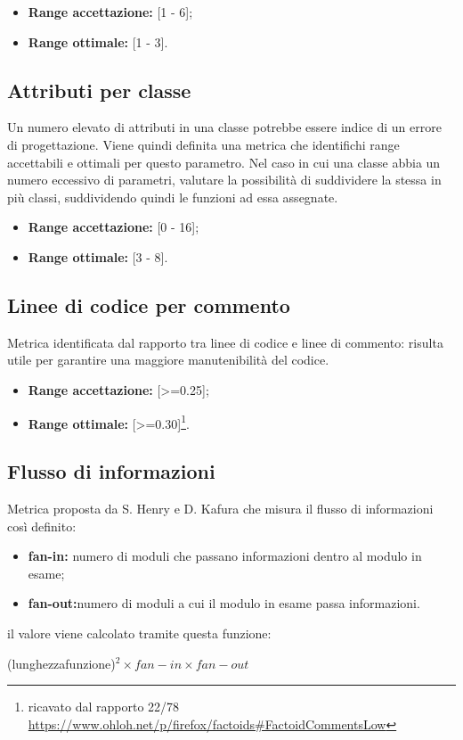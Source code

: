 \begin{itemize}
	\item \textbf{Range accettazione:} [1 - 6];
	\item \textbf{Range ottimale:} [1 - 3].
\end{itemize}  


\subsection{Attributi per classe}
Un numero elevato di attributi in una classe potrebbe essere indice di un errore di progettazione.
Viene quindi definita una metrica che identifichi range accettabili e ottimali per questo parametro.
Nel caso in cui una classe abbia un numero eccessivo di parametri, valutare la possibilità di suddividere la stessa in più classi, suddividendo quindi le funzioni ad essa assegnate.

\begin{itemize}
	\item \textbf{Range accettazione:} [0 - 16];
	\item \textbf{Range ottimale:} [3 - 8].
\end{itemize}  

\subsection{Linee di codice per commento}
Metrica identificata dal rapporto tra linee di codice e linee di commento: risulta utile per garantire una maggiore manutenibilità del codice.

\begin{itemize}
	\item \textbf{Range accettazione:} [>=0.25];
	\item \textbf{Range ottimale:} [>=0.30]\footnote{ricavato dal rapporto 22/78 \url{https://www.ohloh.net/p/firefox/factoids\#FactoidCommentsLow}}.
\end{itemize}  

\subsection{Flusso di informazioni}
Metrica proposta da S. Henry e D. Kafura che misura il flusso di informazioni così definito:

\begin{itemize}
	\item \textbf{fan-in:} numero di moduli che passano informazioni dentro al modulo in esame;
	\item \textbf{fan-out:}numero di moduli a cui il modulo in esame passa informazioni.
\end{itemize} 
il valore viene calcolato tramite questa funzione:
\begin{center}
(lunghezzafunzione)$^2\times fan-in\times fan-out$
\end{center}



